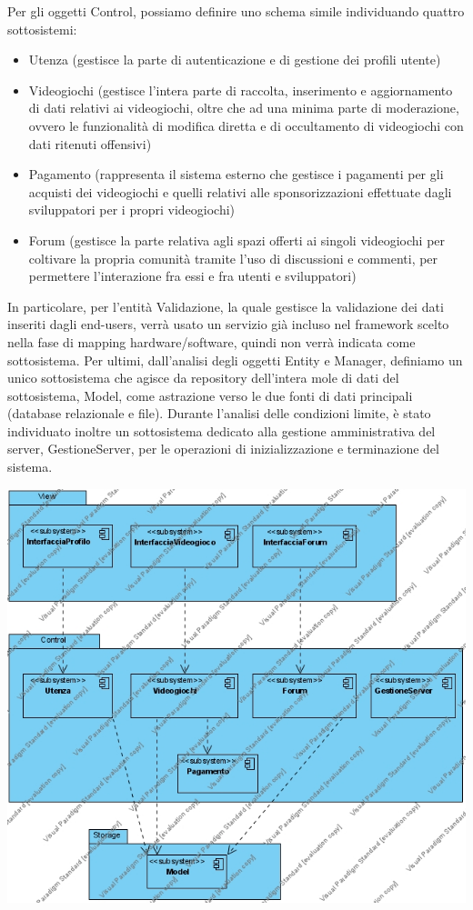 Per gli oggetti Control, possiamo definire uno schema simile individuando quattro sottosistemi:
\begin{itemize}
	\item Utenza (gestisce la parte di autenticazione e di gestione dei profili utente)
	\item Videogiochi (gestisce l’intera parte di raccolta, inserimento e aggiornamento di dati relativi ai videogiochi, oltre che ad una minima parte di moderazione, ovvero le funzionalità di modifica diretta e di occultamento di videogiochi con dati ritenuti offensivi)
	\item Pagamento (rappresenta il sistema esterno che gestisce i pagamenti per gli acquisti dei videogiochi e quelli relativi alle sponsorizzazioni effettuate dagli sviluppatori per i propri videogiochi)
	\item Forum (gestisce la parte relativa agli spazi offerti ai singoli videogiochi per coltivare la propria comunità tramite l’uso di discussioni e commenti, per permettere l’interazione fra essi e fra utenti e sviluppatori)
\end{itemize}
In particolare, per l’entità Validazione, la quale gestisce la validazione dei dati inseriti dagli end-users, verrà usato un servizio già incluso nel framework scelto nella fase di mapping hardware/software, quindi non verrà indicata come sottosistema.
Per ultimi, dall’analisi degli oggetti Entity e Manager, definiamo un unico sottosistema che agisce da repository dell’intera mole di dati del sottosistema, Model, come astrazione verso le due fonti di dati principali (database relazionale e file).
Durante l’analisi delle condizioni limite, è stato individuato inoltre un sottosistema dedicato alla gestione amministrativa del server, GestioneServer, per le operazioni di inizializzazione e terminazione del sistema.
\newpage
\begin{center}
\includegraphics[width=\textwidth,height=\textheight,keepaspectratio]{Figure/SubsystemDiagram.jpg}
\end{center}
\newpage

